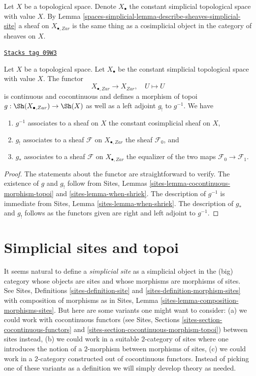 Let $X$ be a topological space. Denote $X_\bullet$ the constant simplicial
topological space with value $X$. By
Lemma \ref{spaces-simplicial-lemma-describe-sheaves-simplicial-site}
a sheaf on $X_{\bullet, Zar}$ is the same
thing as a cosimplicial object in the category of sheaves on $X$.

\begin{lemma}
\label{spaces-simplicial-lemma-constant-simplicial-space}
\href{https://stacks.math.columbia.edu/tag/09W3}{\texttt{Stacks tag 09W3}}

Let $X$ be a topological space. Let $X_\bullet$ be the constant
simplicial topological space with value $X$. The functor
$$
X_{\bullet, Zar} \longrightarrow X_{Zar},\quad
U \longmapsto U
$$
is continuous and cocontinuous and defines a morphism of
topoi $g : \Sh(X_{\bullet, Zar}) \to \Sh(X)$ as well as a left adjoint
$g_!$ to $g^{-1}$. We have
\begin{enumerate}
\item $g^{-1}$ associates to a sheaf on $X$ the constant cosimplicial
sheaf on $X$,
\item $g_!$ associates to a sheaf $\mathcal{F}$ on $X_{\bullet, Zar}$ the
sheaf $\mathcal{F}_0$, and
\item $g_*$ associates to a sheaf $\mathcal{F}$ on $X_{\bullet, Zar}$ the
equalizer of the two maps $\mathcal{F}_0 \to \mathcal{F}_1$.
\end{enumerate}
\end{lemma}

\begin{proof}
The statements about the functor are straightforward to verify.
The existence of $g$ and $g_!$ follow from
Sites, Lemmas \ref{sites-lemma-cocontinuous-morphism-topoi} and
\ref{sites-lemma-when-shriek}. The description of
$g^{-1}$ is immediate from Sites, Lemma \ref{sites-lemma-when-shriek}.
The description of $g_*$ and $g_!$ follows as the functors given are
right and left adjoint to $g^{-1}$.
\end{proof}

\section{Simplicial sites and topoi}
\label{spaces-simplicial-section-simplicial-sites}
It seems natural to define a {\it simplicial site} as a simplicial
object in the (big) category whose objects are sites
and whose morphisms are morphisms of sites.
See Sites, Definitions \ref{sites-definition-site} and
\ref{sites-definition-morphism-sites}
with composition of morphisms as in
Sites, Lemma \ref{sites-lemma-composition-morphisms-sites}.
But here are some variants one might want to consider:
(a) we could work with cocontinuous functors
(see Sites, Sections \ref{sites-section-cocontinuous-functors} and
\ref{sites-section-cocontinuous-morphism-topoi}) between sites instead,
(b) we could work in a suitable $2$-category of sites where one introduces
the notion of a $2$-morphism between morphisms of sites,
(c) we could work in a $2$-category constructed out of cocontinuous
functors. Instead of picking one of these variants as a definition
we will simply develop theory as needed.

